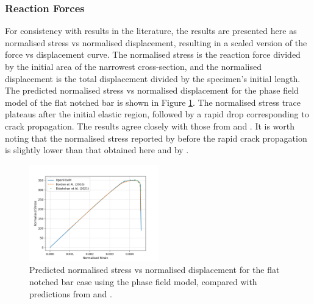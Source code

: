 \documentclass[sn-mathphys,Numbered]{sn-jnl}%
\begin{document}
\subsubsection{Reaction Forces}
For consistency with results in the literature, the results are presented here as normalised stress vs normalised displacement, resulting in a scaled version of the force vs displacement curve.
The normalised stress is the reaction force divided by the initial area of the narrowest cross-section, and the normalised displacement is the total displacement divided by the specimen's initial length.
The predicted normalised stress vs normalised displacement for the phase field model of the flat notched bar is shown in Figure \ref{fig:phaseFieldForce}.
The normalised stress trace plateaus after the initial elastic region, followed by a rapid drop corresponding to crack propagation.
The results agree closely with those from \citet{borden_phase-field_2016} and \citet{eldahshan_phase_2021}.
It is worth noting that the normalised stress reported by \citet{borden_phase-field_2016} before the rapid crack propagation is slightly lower than that obtained here and by \citet{eldahshan_phase_2021}.
\begin{figure}[htb]
\begin{center}
	\includegraphics[width=0.5\textwidth]{./Figures/phaseCompare.png}
	\caption{Predicted normalised stress vs normalised displacement for the flat notched bar case using the phase field model, compared with predictions from \citet{borden_phase-field_2016} and \citet{eldahshan_phase_2021}.}
	\label{fig:phaseFieldForce}
\end{center}
\end{figure}


\end{document}
